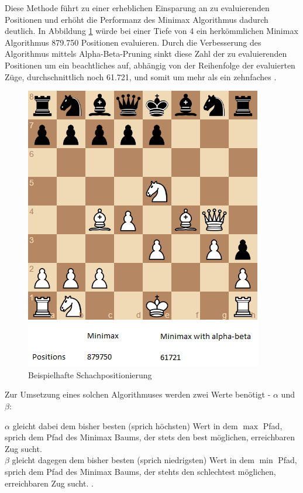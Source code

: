 Diese Methode führt zu einer erheblichen Einsparung an zu evaluierenden Positionen und erhöht die Performanz des Minimax Algorithmus dadurch deutlich. In Abbildung \ref{fig:chess_example} würde bei einer Tiefe von 4 ein herkömmlichen Minimax Algorithmus 879.750 Positionen evaluieren. Durch die Verbesserung des Algorithmus mittels Alpha-Beta-Pruning sinkt diese Zahl der zu evaluierenden Positionen um ein beachtliches auf, abhängig von der Reihenfolge der evaluierten Züge, durchschnittlich noch 61.721, und somit um mehr als ein zehnfaches \cite{Hartikka}.

\begin{figure}[h]
\centering
\includegraphics[width=\textwidth/2]{images/alpha-beta-example.png}

\caption{Beispielhafte Schachpositionierung \cite{Hartikka}}\label{fig:chess_example}
\end{figure}

Zur Umsetzung eines solchen Algorithmuses werden zwei Werte benötigt - $\alpha$ und $\beta$:

$\alpha$ gleicht dabei dem bisher besten (sprich höchsten) Wert in dem $\max$ Pfad, sprich dem Pfad des Minimax Baums, der stets den best möglichen, erreichbaren Zug sucht.\\
$\beta$ gleicht dagegen dem bisher besten (sprich niedrigsten) Wert in dem $\min$ Pfad, sprich dem Pfad des Minimax Baums, der stehts den schlechtest möglichen, erreichbaren Zug sucht. \cite{Russell2010}.

